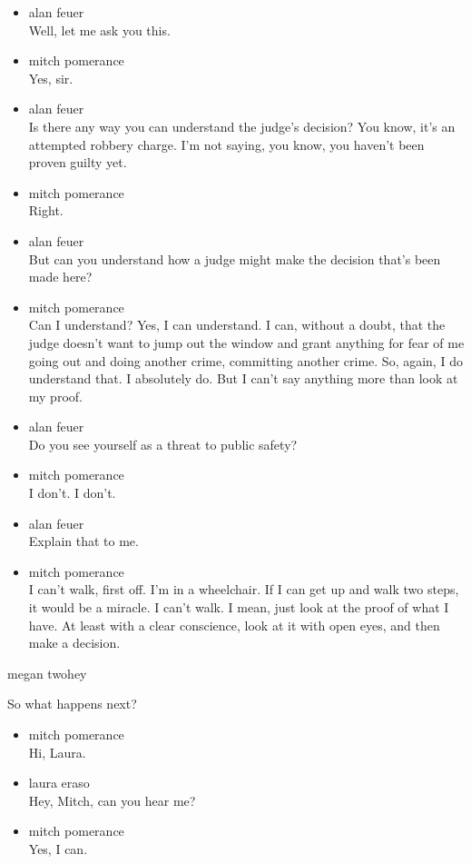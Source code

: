 \begin{itemize}
\item
  alan feuer\\
  Well, let me ask you this.
\item
  mitch pomerance\\
  Yes, sir.
\item
  alan feuer\\
  Is there any way you can understand the judge's decision? You know,
  it's an attempted robbery charge. I'm not saying, you know, you
  haven't been proven guilty yet.
\item
  mitch pomerance\\
  Right.
\item
  alan feuer\\
  But can you understand how a judge might make the decision that's been
  made here?
\item
  mitch pomerance\\
  Can I understand? Yes, I can understand. I can, without a doubt, that
  the judge doesn't want to jump out the window and grant anything for
  fear of me going out and doing another crime, committing another
  crime. So, again, I do understand that. I absolutely do. But I can't
  say anything more than look at my proof.
\item
  alan feuer\\
  Do you see yourself as a threat to public safety?
\item
  mitch pomerance\\
  I don't. I don't.
\item
  alan feuer\\
  Explain that to me.
\item
  mitch pomerance\\
  I can't walk, first off. I'm in a wheelchair. If I can get up and walk
  two steps, it would be a miracle. I can't walk. I mean, just look at
  the proof of what I have. At least with a clear conscience, look at it
  with open eyes, and then make a decision.
\end{itemize}

megan twohey

So what happens next?

\begin{itemize}
\item
  mitch pomerance\\
  Hi, Laura.
\item
  laura eraso\\
  Hey, Mitch, can you hear me?
\item
  mitch pomerance\\
  Yes, I can.
\end{itemize}

